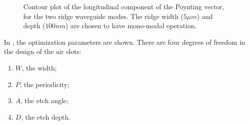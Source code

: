 \begin{figure}[htbp]
  \begin{center}
  \end{center}
  \caption{Contour plot of the longitudinal component of the Poynting
    vector, for the two ridge waveguide modes. The ridge width ($5 \mu
    m$) and depth ($100 nm$) are chosen to have mono-modal operation.}
  \label{fig:polrot_ridge}
\end{figure}

In , the optimization parameters are
shown. There are four degrees of freedom in the design of the air
slots:
\begin{enumerate}
\item $W$, the width;
\item $P$, the periodicity;
\item $A$, the etch angle;
\item $D$, the etch depth.
\end{enumerate}


